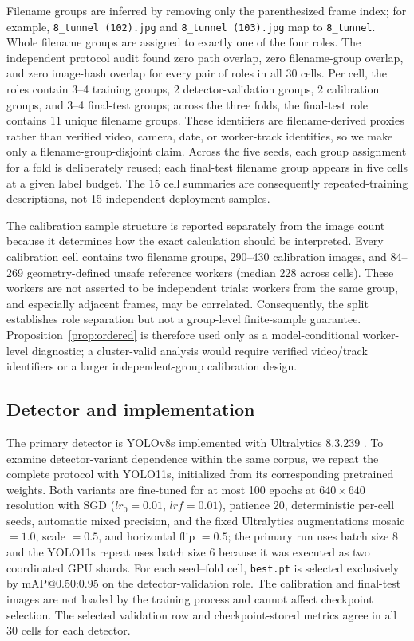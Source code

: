 \documentclass[iicol,pdflatex,sn-mathphys-num]{sn-jnl}
\begin{document}
Filename groups are inferred by removing only the parenthesized frame index; for example, \texttt{8\_tunnel (102).jpg} and \texttt{8\_tunnel (103).jpg} map to \texttt{8\_tunnel}. Whole filename groups are assigned to exactly one of the four roles. The independent protocol audit found zero path overlap, zero filename-group overlap, and zero image-hash overlap for every pair of roles in all 30 cells. Per cell, the roles contain 3--4 training groups, 2 detector-validation groups, 2 calibration groups, and 3--4 final-test groups; across the three folds, the final-test role contains 11 unique filename groups. These identifiers are filename-derived proxies rather than verified video, camera, date, or worker-track identities, so we make only a filename-group-disjoint claim. Across the five seeds, each group assignment for a fold is deliberately reused; each final-test filename group appears in five cells at a given label budget. The 15 cell summaries are consequently repeated-training descriptions, not 15 independent deployment samples.

The calibration sample structure is reported separately from the image count because it determines how the exact calculation should be interpreted. Every calibration cell contains two filename groups, 290--430 calibration images, and 84--269 geometry-defined unsafe reference workers (median 228 across cells). These workers are not asserted to be independent trials: workers from the same group, and especially adjacent frames, may be correlated. Consequently, the split establishes role separation but not a group-level finite-sample guarantee. Proposition~\ref{prop:ordered} is therefore used only as a model-conditional worker-level diagnostic; a cluster-valid analysis would require verified video/track identifiers or a larger independent-group calibration design.

\subsection{Detector and implementation}

The primary detector is YOLOv8s implemented with Ultralytics 8.3.239 \cite{ultralytics2025}. To examine detector-variant dependence within the same corpus, we repeat the complete protocol with YOLO11s, initialized from its corresponding pretrained weights. Both variants are fine-tuned for at most 100 epochs at $640\times640$ resolution with SGD ($lr_0=0.01$, $lrf=0.01$), patience 20, deterministic per-cell seeds, automatic mixed precision, and the fixed Ultralytics augmentations mosaic $=1.0$, scale $=0.5$, and horizontal flip $=0.5$; the primary run uses batch size 8 and the YOLO11s repeat uses batch size 6 because it was executed as two coordinated GPU shards. For each seed--fold cell, \texttt{best.pt} is selected exclusively by mAP@0.50:0.95 on the detector-validation role. The calibration and final-test images are not loaded by the training process and cannot affect checkpoint selection. The selected validation row and checkpoint-stored metrics agree in all 30 cells for each detector.
\end{document}
